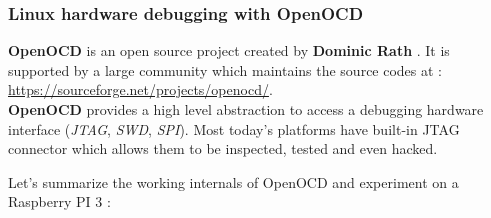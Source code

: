 \subsubsection{Linux hardware debugging with OpenOCD}
\label{Linux hardware debugging with OpenOCD}
\textbf{OpenOCD} is an open source project created by \og \textbf{Dominic Rath} \fg . It is supported by a large community which
maintains the source codes at : {\color{blue}\url{https://sourceforge.net/projects/openocd/}}.\\
\textbf{OpenOCD} provides a high level abstraction to access a debugging hardware interface (\emph{JTAG}, \emph{SWD}, \emph{SPI}). Most
today's platforms have built-in JTAG connector which allows them to be {\color{green}inspected}, {\color{orange}tested} and even {\color{red}hacked}.

Let's summarize the working internals of OpenOCD and experiment on a Raspberry PI 3 : 

